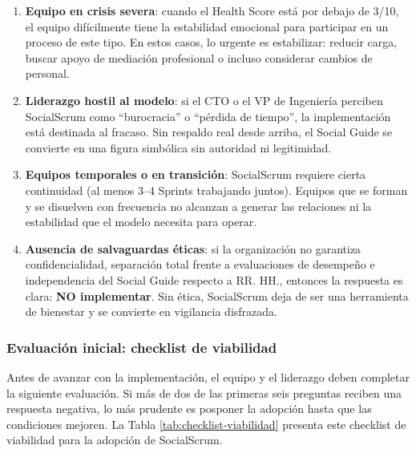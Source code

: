 \begin{enumerate}
    \item \textbf{Equipo en crisis severa}: cuando el Health Score está por debajo de 3/10, el equipo difícilmente tiene la estabilidad emocional para participar en un proceso de este tipo. En estos casos, lo urgente es estabilizar: reducir carga, buscar apoyo de mediación profesional o incluso considerar cambios de personal.

    \item \textbf{Liderazgo hostil al modelo}: si el CTO o el VP de Ingeniería perciben SocialScrum como ``burocracia'' o ``pérdida de tiempo'', la implementación está destinada al fracaso. Sin respaldo real desde arriba, el Social Guide se convierte en una figura simbólica sin autoridad ni legitimidad.

    \item \textbf{Equipos temporales o en transición}: SocialScrum requiere cierta continuidad (al menos 3–4 Sprints trabajando juntos). Equipos que se forman y se disuelven con frecuencia no alcanzan a generar las relaciones ni la estabilidad que el modelo necesita para operar.

    \item \textbf{Ausencia de salvaguardas éticas}: si la organización no garantiza confidencialidad, separación total frente a evaluaciones de desempeño e independencia del Social Guide respecto a RR. HH., entonces la respuesta es clara: \textbf{NO implementar}. Sin ética, SocialScrum deja de ser una herramienta de bienestar y se convierte en vigilancia disfrazada.
\end{enumerate}

\subsubsection{Evaluación inicial: checklist de viabilidad}

Antes de avanzar con la implementación, el equipo y el liderazgo deben completar la siguiente evaluación. Si más de dos de las primeras seis preguntas reciben una respuesta negativa, lo más prudente es posponer la adopción hasta que las condiciones mejoren. La Tabla \ref{tab:checklist-viabilidad} presenta este checklist de viabilidad para la adopción de SocialScrum.

\begingroup
\scriptsize
\renewcommand{\arraystretch}{1.4}
\setlength{\tabcolsep}{4pt}
\setlength{\LTleft}{0pt}
\setlength{\LTright}{0pt}

